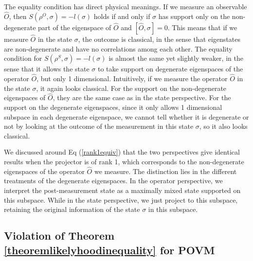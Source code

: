 \documentclass[11pt]{article}
\theoremstyle{definition}
\begin{document}
The equality condition has direct physical meanings. If we measure an observable $\hat O$, then $S(\rho^O, \sigma)=-l(\sigma)$ holds if and only if $\sigma$ has support only on the non-degenerate part of the eigenspace of $\hat O$ and $[\hat O,\sigma]=0$. This means that if we measure $\hat O$ in the state $\sigma$, the outcome is classical, in the sense that eigenstates are non-degenerate and have no correlations among each other. The equality condition for $S(\rho^S, \sigma)=-l(\sigma)$ is almost the same yet slightly weaker, in the sense that it allows the state $\sigma$ to take support on degenerate eigenspaces of the operator $\hat O$, but only 1 dimensional. Intuitively, if we measure the operator $\hat O$ in the state $\sigma$, it again looks classical. For the support on the non-degenerate eigenspaces of $\hat O$, they are the same case as in the state perspective. For the support on the degenerate eigenspaces, since it only allows 1 dimensional subspace in each degenerate eigenspace, we cannot tell whether it is degenerate or not by looking at the outcome of the measurement in this state $\sigma$, so it also looks classical.



We discussed around Eq (\ref{rank1equiv}) that the two perspectives give identical results when the projector is of rank 1, which corresponds to the non-degenerate eigenspaces of the operator $\hat O$ we measure. The distinction lies in the different treatments of the degenerate eigenspaces. In the operator perspective, we interpret the post-measurement state as a maximally mixed state supported on this subspace. While in the state perspective, we just project to this subspace, retaining the original information of the state $\sigma$ in this subspace.

\subsection{Violation of Theorem \ref{theoremlikelyhoodinequality} for POVM}
\end{document}
